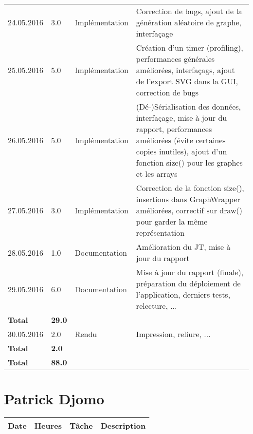 \documentclass[french]{article}
\begin{document}
\begin{longtable}{p{}|p{}|p{}|p{}}
		24.05.2016 & 3.0 & Implémentation & Correction de bugs, ajout de la génération aléatoire de graphe, interfaçage\\
		25.05.2016 & 5.0 & Implémentation & Création d'un timer (profiling), performances générales améliorées, interfaçags, ajout de l'export SVG dans la GUI, correction de bugs\\
		26.05.2016 & 5.0 & Implémentation & (Dé-)Sérialisation des données, interfaçage, mise à jour du rapport, performances améliorées (évite certaines copies inutiles), ajout d'un fonction size() pour les graphes et les arrays\\
		27.05.2016 & 3.0 & Implémentation & Correction de la fonction size(), insertions dans GraphWrapper améliorées, correctif sur draw() pour garder la même représentation\\
		28.05.2016 & 1.0 & Documentation & Amélioration du JT, mise à jour du rapport\\
		29.05.2016 & 6.0 & Documentation & Mise à jour du rapport (finale), préparation du déploiement de l'application, derniers tests, relecture, ...\\  
		\textbf{Total} & \textbf{29.0} &&\\
		\hline
		30.05.2016 & 2.0 & Rendu & Impression, reliure, ...\\
		\textbf{Total} & \textbf{2.0} && \\
		\hline
		\hline
		\textbf{Total} & \textbf{88.0} &&\\
	\end{longtable}
	
	\section*{Patrick Djomo}
	\begin{longtable}{p{}|p{}|p{}|p{}}
		Date&Heures&Tâche&Description\\
		\hline
	\end{longtable}
	
\end{document}
